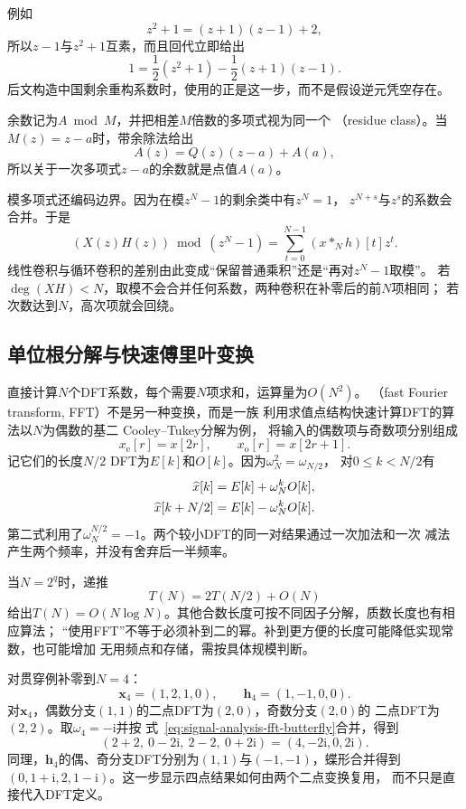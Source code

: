 例如
\[
  z^2+1=(z+1)(z-1)+2,
\]
所以$z-1$与$z^2+1$互素，而且回代立即给出
\[
  1=\frac{1}{2}(z^2+1)-\frac{1}{2}(z+1)(z-1).
\]
后文构造中国剩余重构系数时，使用的正是这一步，而不是假设逆元凭空存在。

余数记为$A\bmod M$，并把相差$M$倍数的多项式视为同一个
（residue class）。当$M(z)=z-a$时，带余除法给出
\[
  A(z)=Q(z)(z-a)+A(a),
\]
所以关于一次多项式$z-a$的余数就是点值$A(a)$。

模多项式还编码边界。因为在模$z^N-1$的剩余类中有$z^N=1$，
$z^{N+s}$与$z^s$的系数会合并。于是
\begin{equation}
  \left(X(z)H(z)\right)\bmod(z^N-1)
  =
  \sum_{t=0}^{N-1}(x*_Nh)[t]z^t.
  \label{eq:signal-analysis-polynomial-circular-convolution}
\end{equation}
线性卷积与循环卷积的差别由此变成“保留普通乘积”还是“再对$z^N-1$取模”。
若$\deg(XH)<N$，取模不会合并任何系数，两种卷积在补零后的前$N$项相同；
若次数达到$N$，高次项就会回绕。

\subsection{单位根分解与快速傅里叶变换}

直接计算$N$个DFT系数，每个需要$N$项求和，运算量为$O(N^2)$。
（fast Fourier transform, FFT）不是另一种变换，而是一族
利用求值点结构快速计算DFT的算法以$N$为偶数的基二
Cooley--Tukey分解为例，
将输入的偶数项与奇数项分别组成
\[
  x_{\mathrm{e}}[r]=x[2r],\qquad
  x_{\mathrm{o}}[r]=x[2r+1].
\]
记它们的长度$N/2$ DFT为$E[k]$和$O[k]$。因为$\omega_N^2=\omega_{N/2}$，
对$0\leq k<N/2$有
\begin{align}
  \widehat{x}[k]
  &=
  E[k]+\omega_N^kO[k],
  \notag\\
  \widehat{x}[k+N/2]
  &=
  E[k]-\omega_N^kO[k].
  \label{eq:signal-analysis-fft-butterfly}
\end{align}
第二式利用了$\omega_N^{N/2}=-1$。两个较小DFT的同一对结果通过一次加法和一次
减法产生两个频率，并没有舍弃后一半频率。

当$N=2^q$时，递推
\[
  T(N)=2T(N/2)+O(N)
\]
给出$T(N)=O(N\log N)$。其他合数长度可按不同因子分解，质数长度也有相应算法；
“使用FFT”不等于必须补到二的幂。补到更方便的长度可能降低实现常数，也可能增加
无用频点和存储，需按具体规模判断。

对贯穿例补零到$N=4$：
\[
  \bm{x}_4=(1,2,1,0),\qquad
  \bm{h}_4=(1,-1,0,0).
\]
对$\bm{x}_4$，偶数分支$(1,1)$的二点DFT为$(2,0)$，奇数分支$(2,0)$的
二点DFT为$(2,2)$。取$\omega_4=-\mathrm{i}$并按
式~\eqref{eq:signal-analysis-fft-butterfly}合并，得到
\[
  (2+2,\ 0-2\mathrm{i},\ 2-2,\ 0+2\mathrm{i})
  =
  (4,-2\mathrm{i},0,2\mathrm{i}).
\]
同理，$\bm{h}_4$的偶、奇分支DFT分别为$(1,1)$与$(-1,-1)$，蝶形合并得到
$(0,1+\mathrm{i},2,1-\mathrm{i})$。这一步显示四点结果如何由两个二点变换复用，
而不只是直接代入DFT定义。

